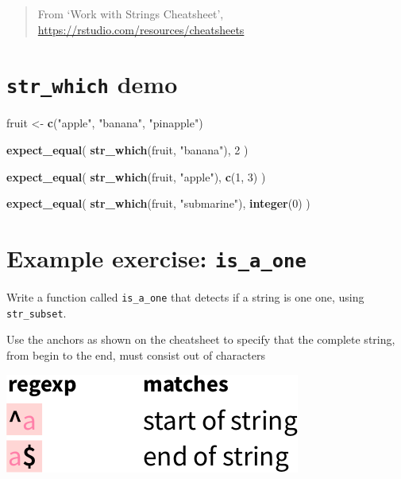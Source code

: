 \documentclass[]{book}
\newenvironment{Shaded}{}{}
\newcommand{\DecValTok}[1]{\textcolor[rgb]{0.25,0.63,0.44}{#1}}
\newcommand{\KeywordTok}[1]{\textcolor[rgb]{0.00,0.44,0.13}{\textbf{#1}}}
\newcommand{\NormalTok}[1]{#1}
\newcommand{\StringTok}[1]{\textcolor[rgb]{0.25,0.44,0.63}{#1}}
\begin{document}
\begin{quote}
From `Work with Strings Cheatsheet', \url{https://rstudio.com/resources/cheatsheets}
\end{quote}

\hypertarget{str_which-demo}{%
\section{\texorpdfstring{\texttt{str\_which} demo}{str\_which demo}}\label{str_which-demo}}

\begin{Shaded}
\begin{Highlighting}[]
\NormalTok{fruit <-}\StringTok{ }\KeywordTok{c}\NormalTok{(}\StringTok{"apple"}\NormalTok{, }\StringTok{"banana"}\NormalTok{, }\StringTok{"pinapple"}\NormalTok{)}

\KeywordTok{expect_equal}\NormalTok{(}
  \KeywordTok{str_which}\NormalTok{(fruit, }\StringTok{"banana"}\NormalTok{),}
  \DecValTok{2}
\NormalTok{)}

\KeywordTok{expect_equal}\NormalTok{(}
  \KeywordTok{str_which}\NormalTok{(fruit, }\StringTok{"apple"}\NormalTok{),}
  \KeywordTok{c}\NormalTok{(}\DecValTok{1}\NormalTok{, }\DecValTok{3}\NormalTok{)}
\NormalTok{)}

\KeywordTok{expect_equal}\NormalTok{(}
  \KeywordTok{str_which}\NormalTok{(fruit, }\StringTok{"submarine"}\NormalTok{),}
  \KeywordTok{integer}\NormalTok{(}\DecValTok{0}\NormalTok{)}
\NormalTok{)}
\end{Highlighting}
\end{Shaded}

\hypertarget{example-exercise-is_a_one}{%
\section{\texorpdfstring{Example exercise: \texttt{is\_a\_one}}{Example exercise: is\_a\_one}}\label{example-exercise-is_a_one}}

Write a function called \texttt{is\_a\_one} that detects if a string is one one,
using \texttt{str\_subset}.

Use the anchors as shown on the cheatsheet to specify that
the complete string, from begin to the end, must consist out of characters

\includegraphics{06_anchors.png}
\end{document}
